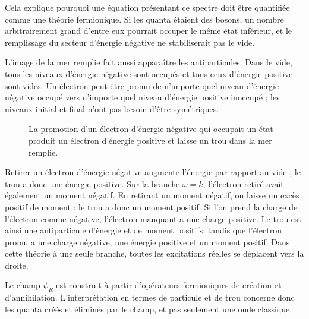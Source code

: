 Cela explique pourquoi une équation présentant ce spectre doit être quantifiée comme une théorie fermionique. Si les quanta étaient des bosons, un nombre arbitrairement grand d’entre eux pourrait occuper le même état inférieur, et le remplissage du secteur d’énergie négative ne stabiliserait pas le vide.

L’image de la mer remplie fait aussi apparaître les antiparticules. Dans le vide, tous les niveaux d’énergie négative sont occupés et tous ceux d’énergie positive sont vides. Un électron peut être promu de n’importe quel niveau d’énergie négative occupé vers n’importe quel niveau d’énergie positive inoccupé ; les niveaux initial et final n’ont pas besoin d’être symétriques.

\begin{figure}[htbp]
\centering
{}
\caption{La promotion d’un électron d’énergie négative qui occupait un état produit un électron d’énergie positive et laisse un trou dans la mer remplie.}
\end{figure}

Retirer un électron d’énergie négative augmente l’énergie par rapport au vide ; le trou a donc une énergie positive. Sur la branche \(\omega=k\), l’électron retiré avait également un moment négatif. En retirant un moment négatif, on laisse un excès positif de moment : le trou a donc un moment positif. Si l’on prend la charge de l’électron comme négative, l’électron manquant a une charge positive. Le trou est ainsi une antiparticule d’énergie et de moment positifs, tandis que l’électron promu a une charge négative, une énergie positive et un moment positif. Dans cette théorie à une seule branche, toutes les excitations réelles se déplacent vers la droite.

Le champ \(\psi_R\) est construit à partir d’opérateurs fermioniques de création et d’annihilation. L’interprétation en termes de particule et de trou concerne donc les quanta créés et éliminés par le champ, et pas seulement une onde classique.

